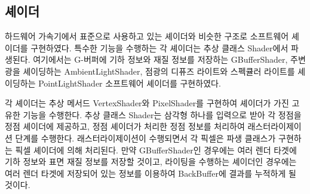 \documentclass[a4paper,itemph,amsmath,oneside,11pt,openany]{xoblivoir}
\begin{document}
\subsection{셰이더}
하드웨어 가속기에서 표준으로 사용하고 있는 셰이더와 비슷한 구조로 소프트웨어 셰이더를 구현하였다.
특수한 기능을 수행하는 각 셰이더는 추상 클래스 Shader에서 파생된다. 여기에서는 G-버퍼에 기하 정보와
재질 정보를 저장하는 GBufferShader, 주변광을 셰이딩하는 AmbientLightShader, 점광의 디퓨즈 라이트와 스펙큘러 라이트를
셰이딩하는 PointLightShader 소프트웨어 셰이더를 구현하였다.

각 셰이더는 추상 메서드 VertexShader와 PixelShader를 구현하여 셰이더가 가진 고유한 기능을 수행한다.
추상 클래스 Shader는 삼각형 하나를 입력으로 받아 각 정점을 정점 셰이더에 제공하고, 정점 셰이더가 처리한 정점 정보를
처리하여 래스터라이제이션 단계를 수행한다. 래스터라이제이션이 수행되면서 각 픽셀은 파생 클래스가 구현하는 픽셀 셰이더에
의해 처리된다. 만약 GBufferShader인 경우에는 여러 렌더 타겟에 기하 정보와 표면 재질 정보를 저장할 것이고,
라이팅을 수행하는 셰이더인 경우에는 여러 렌더 타겟에 저장되어 있는 정보를 이용하여 BackBuffer에 결과를 누적하게 될 것이다.
\end{document}
